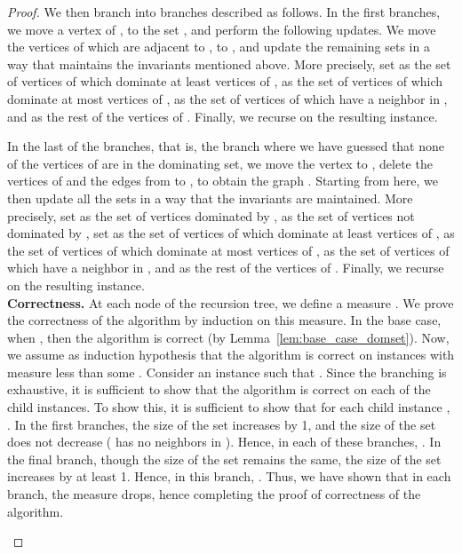 \begin{proof}
We then branch into  branches described as follows. In the first  branches, we move a vertex  of , to the set , and perform the following updates. We move the vertices of  which are adjacent to , to , and update the remaining sets in a way that maintains the invariants mentioned above. More precisely, set  as the set of vertices of  which dominate at least  vertices of ,  as the set of vertices of  which dominate at most  vertices of ,  as the set of vertices of  which have a neighbor in , and  as the rest of the vertices of . Finally, we recurse on the resulting instance.



In the last of the  branches, that is, the branch where we have guessed that none of the vertices of  are in the dominating set, we move the vertex  to , delete the vertices of  and the edges from  to , to obtain the graph . Starting from here, we then update all the sets in a way that the invariants are maintained. More precisely, set  as the set of vertices dominated by ,  as the set of vertices not dominated by , set  as the set of vertices of  which dominate at least  vertices of ,  as the set of vertices of  which dominate at most  vertices of ,  as the set of vertices of  which have a neighbor in , and  as the rest of the vertices of . Finally, we recurse on the resulting instance.\\


\noindent
{\bf Correctness.}
At each node of the recursion tree, we define a measure . We prove the correctness of the algorithm by induction on this measure. In the base case, when , then the algorithm is correct (by Lemma~\ref{lem:base_case_domset}). Now, we assume as induction hypothesis that the algorithm is correct on instances with measure less than some . Consider an instance  such that . Since the branching is exhaustive, it is sufficient to show that the algorithm is correct on each of the child instances. To show this, it is sufficient to show that for each child instance , . In the first  branches, the size of the set  increases by 1, and the size of the set  does not decrease ( has no neighbors in ). Hence, in each of these branches, . In the final branch, though the size of the set  remains the 
same, the size of the set  increases by at least 1. 
Hence, in this branch, . Thus, we have shown that in each branch, the measure drops, hence completing the proof of correctness of the algorithm.\\

\begin{algorithm}[t]


\end{algorithm}
\end{proof}
